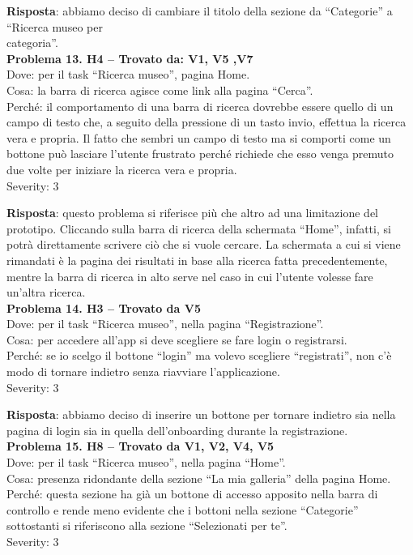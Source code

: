 \documentclass{article}
\begin{document}
\noindent \textbf{Risposta}: abbiamo deciso di cambiare il titolo della sezione da “Categorie” a “Ricerca museo per\\ categoria”.\\

\noindent \textbf{Problema 13. H4 – Trovato da: V1, V5 ,V7} \\
Dove: per il task “Ricerca museo”, pagina Home. \\
Cosa: la barra di ricerca agisce come link alla pagina “Cerca”. \\
Perché: il comportamento di una barra di ricerca dovrebbe essere quello di un campo di testo che, a seguito della pressione di un tasto invio, effettua la ricerca vera e propria. Il fatto che sembri un campo di testo ma si comporti come un bottone può lasciare l’utente frustrato perché richiede che esso venga premuto due volte per iniziare la ricerca vera e propria. \\
Severity: 3

\noindent \textbf{Risposta}: questo problema si riferisce più che altro ad una limitazione del prototipo. Cliccando sulla barra di ricerca della schermata “Home”, infatti, si potrà direttamente scrivere ciò che si vuole cercare. La schermata a cui si viene rimandati è la pagina dei risultati in base alla ricerca fatta precedentemente, mentre la barra di ricerca in alto serve nel caso in cui l’utente volesse fare un’altra ricerca.\\
\newpage
\noindent \textbf{Problema 14. H3 – Trovato da V5} \\
Dove: per il task “Ricerca museo”, nella pagina “Registrazione”. \\
Cosa: per accedere all’app si deve scegliere se fare login o registrarsi. \\
Perché: se io scelgo il bottone “login” ma volevo scegliere “registrati”, non c’è modo di tornare indietro senza riavviare l’applicazione. \\
Severity: 3

\noindent \textbf{Risposta}: abbiamo deciso di inserire un bottone per tornare indietro sia nella pagina di login sia in quella dell’onboarding durante la registrazione. \\

\noindent \textbf{Problema 15. H8 – Trovato da V1, V2, V4, V5} \\
Dove: per il task “Ricerca museo”, nella pagina “Home”. \\
Cosa: presenza ridondante della sezione “La mia galleria” della pagina Home. \\
Perché: questa sezione ha già un bottone di accesso apposito nella barra di controllo e rende meno evidente che i bottoni nella sezione “Categorie” sottostanti si riferiscono alla sezione “Selezionati per te”. \\
Severity: 3  
\end{document}
